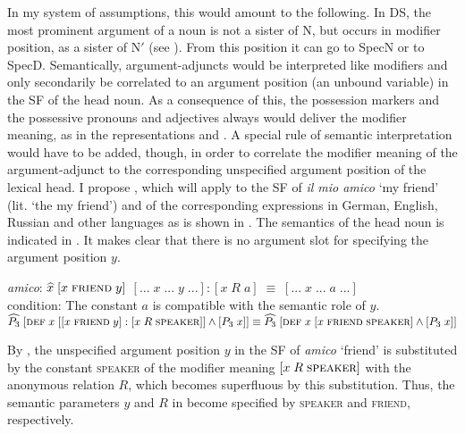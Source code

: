 \documentclass[output=paper,colorlinks,citecolor=brown]{langscibook}
\begin{document}
In my system of assumptions, this would amount to the following. In DS, the most prominent argument of a noun is not a sister of N, but occurs in modifier position, as a sister of N$'$ (see ). From this position it can go to SpecN or to SpecD. Semantically, argument-adjuncts would be interpreted like modifiers and only secondarily be correlated to an argument position (an unbound variable) in the SF of the head noun. As a consequence of this, the possession markers and the possessive pronouns and adjectives always would deliver the modifier meaning, as in the representations  and . A special rule of semantic interpretation would have to be added, though, in order to correlate the modifier meaning of the argument-adjunct to the corresponding unspecified argument position of the lexical head. I propose , which will apply to the SF of \textit{il mio amico} ‘my friend’ (lit. ‘the my friend’) and of the corresponding expressions in German, English, Russian and other languages as is shown in . The semantics of the head noun is indicated in . It makes clear that there is no argument slot for specifying the argument position $y$.

\ea \label{ex:zi91:68} \textit{amico}: $\widehat{x} \; [x \; \textsc{friend} \; y]$
\ex \label{ex:zi91:69} $[... \; x \; ... \; y \; ...]:[x \; R \; a] \; \equiv \; [... \; x \; ... \; a \; ...]$ \\
condition: The constant $a$ is compatible with the semantic role of $y$.
\ex \label{ex:zi91:70} $\widehat{P_{3}} \; [\textsc{def} \; x \; [[x \; \textsc{friend} \; y]:[x \; R \; \textsc{speaker}]] \wedge [P_{3} \; x]] \equiv \widehat{P_{3}} \; [\textsc{def} \; x \; [x \; \textsc{friend} \; \textsc{speaker}]\wedge[P_{3} \; x]]$
\z

\noindent By , the unspecified argument position $y$ in the SF  of \textit{amico} ‘friend’ is substituted by the constant \textsc{speaker} of the modifier meaning $[x \; R \; \textsc{speaker}]$ with the anonymous relation $R$, which becomes superfluous by this substitution. Thus, the semantic parameters $y$ and $R$ in  become specified by \textsc{speaker} and \textsc{friend}, respectively.
\end{document}
